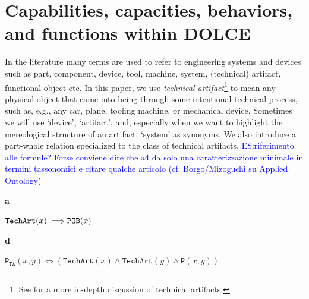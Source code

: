 \documentclass[sw]{iosart2x}
\newcommand{\bflist}{\begin{list}{}{\setlength{\topsep}{2mm}\setlength{\partopsep}{0mm}\setlength{\parsep}{0mm}\setlength{\leftmargin}{9mm}\setlength{\labelwidth}{8mm}}}
\newcommand{\eflist}{\end{list}}
\newcommand{\AxLabel}{\textrm{a}}
\newcommand{\DefLabel}{\textrm{d}}
\newcounter{cntax}
\newcommand{\myax}[1]{\refstepcounter{cntax}\begin{small}{\bf \AxLabel\thecntax\label{ax:#1}}\end{small}}
\newcounter{cntdef}
\newcommand{\mydf}[1]{\refstepcounter{cntdef}\begin{small}{\bf \DefLabel\thecntdef\label{def:#1}}\end{small}}
\newcommand{\generalStyle}[1]{\texttt{#1}}
\newcommand{\biRel}[3]{\generalStyle{#1}(#2,#3)}
\newcommand{\uniRel}[2]{\generalStyle{#1}(#2)}
\newcommand{\biRelPar}[4]{\generalStyle{#1}_{\generalStyle{#4}}(#2,#3)}
\newcommand{\myiff}{\Longleftrightarrow}
\newcommand{\myfi}{\hspace{0.9mm} \Longrightarrow}
\newcommand{\DOLCE}{\textsc{DOLCE}\xspace} %
\newcommand{\DOLCEPhysObj}[1]{\uniRel{{POB}}{#1}}
\newcommand{\DOLCEPart}[2]{\biRel{{P}}{#1}{#2}}
\newcommand{\TechArt}[1]{\uniRel{TechArt}{#1}}
\newcommand{\Component}[1]{\uniRel{Component}{#1}}
\newcommand{\partTA}[2]{\biRelPar{P}{#1}{#2}{TA}}
\newcommand{\firstTimeKeyWord}[1]{\textit{#1}}
\newcommand{\quotes}[1]{`#1'}
\newcommand{\TODO}[1]{{\color{red} #1}}
\newcommand{\TODOinline}[1]{{\color{red} #1}}
\begin{document}
\section{Capabilities, capacities, behaviors, and functions within \DOLCE \label{sec:capabilitiesEtc}}
In the literature many terms are used to refer to engineering systems and devices such as part, component, device, tool, machine, system, (technical) artifact, functional object etc. 
In this paper, we use \firstTimeKeyWord{technical artifact}\footnote{See \cite{borgoTechnicalArtifactsIntegrated2017} for a more in-depth discussion of technical artifacts.} to mean any physical object that came into being through some intentional technical process, such as, e.g., any car, plane, tooling machine, or mechanical device. Sometimes we will use \quotes{device}, \quotes{artifact}, and,  especially when we want to highlight the mereological structure of an artifact, \quotes{system} as synonyms.
We also introduce a part-whole relation specialized to the class of technical artifacts.
\textcolor{blue}{ES:riferimento alle formule? Forse conviene dire che a4 da solo una caratterizzazione minimale in termini tassonomici e citare qualche articolo (cf. Borgo/Mizoguchi su Applied Ontology)}
\bflist
\item[\myax{subsumptionTArt}] $ \TechArt{x} \myfi \DOLCEPhysObj{x}$%
\item[\mydf{partTA}] $ \partTA{x}{y} \myiff (\TechArt{x} \land \TechArt{y} \land  \DOLCEPart{x}{y})  $%
\eflist
\end{document}
